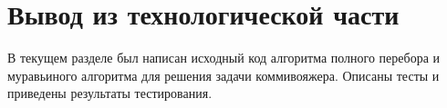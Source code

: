 \section*{Вывод из технологической части}

В текущем разделе был написан исходный код алгоритма полного перебора и муравьиного алгоритма для решения задачи коммивояжера. 
Описаны тесты и приведены результаты тестирования.
